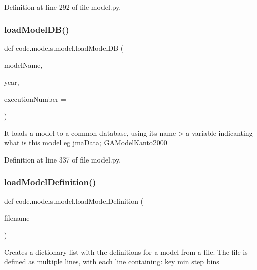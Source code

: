 Definition at line 292 of file model.\+py.

\mbox{\label{namespacecode_1_1models_1_1model_af416cfbe0575d995dc58ec43631223bf}} 
\subsubsection{\texorpdfstring{load\+Model\+D\+B()}{loadModelDB()}}
{\footnotesize\ttfamily def code.\+models.\+model.\+load\+Model\+DB (\begin{DoxyParamCaption}\item[{}]{model\+Name,  }\item[{}]{year,  }\item[{}]{execution\+Number = {} }\end{DoxyParamCaption})}

\begin{DoxyVerb}It loads a model to a common database, using its name-> a variable indicanting what is this model
eg jmaData; GAModelKanto2000
\end{DoxyVerb}
 

Definition at line 337 of file model.\+py.

\mbox{\label{namespacecode_1_1models_1_1model_a516aba6a18e97e9ca010b3b8ce66d033}} 
\subsubsection{\texorpdfstring{load\+Model\+Definition()}{loadModelDefinition()}}
{\footnotesize\ttfamily def code.\+models.\+model.\+load\+Model\+Definition (\begin{DoxyParamCaption}\item[{}]{filename }\end{DoxyParamCaption})}

\begin{DoxyVerb}Creates a dictionary list with the definitions for a model from a file.
The file is defined as multiple lines, with each line containing:
key min step bins
\end{DoxyVerb}
 

